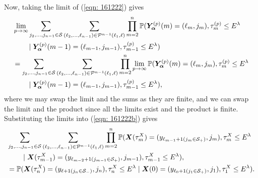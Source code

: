Now, taking the limit of (\ref{eqn: 161222}) gives 
\begin{align}
	&\lim_{p\to\infty}\sum_{j_2,\dots,j_{n-1}\in\mathcal S}\sum_{(\ell_2,\dots,\ell_{n-1}) \in\mathcal P^{n-1}(\ell_1,\ell)}\prod_{m=2}^{n}\mathbb P(\bm{Y}_{\bm{\alpha}}^{(p)}(m) = (\ell_m, j_m), \tau_{m}^{(p)}\leq E^\lambda \nonumber
            	 \\&\qquad\mid \bm{Y}_{\bm{\alpha}}^{(p)}(m-1) = (\ell_{m-1}, j_{m-1}), \tau_{m-1}^{(p)}\leq E^\lambda) \nonumber 
	\\ &=\sum_{j_2,\dots,j_{n-1}\in\mathcal S}\sum_{(\ell_2,\dots,\ell_{n-1}) \in\mathcal P^{n-1}(\ell_1,\ell)}\prod_{m=2}^{n}\lim_{p\to\infty} \mathbb P(\bm{Y}_{\bm{\alpha}}^{(p)}(m) = (\ell_m, j_m), \tau_{m}^{(p)}\leq E^\lambda \nonumber
            	 \\&\qquad \mid \bm{Y}_{\bm{\alpha}}^{(p)}(m-1) = (\ell_{m-1}, 
	 	 j_{m-1}), \tau_{m-1}^{(p)}\leq E^\lambda),
	 \label{eqn: 161222b}
\end{align}
where we may swap the limit and the sums as they are finite, and we can swap the limit and the product since all the limits exist and the product is finite. Substituting the limits into (\ref{eqn: 161222b}) gives 
\begin{align}
	&\sum_{j_2,\dots,j_{n-1}\in\mathcal S}\sum_{(\ell_2,\dots,\ell_{n-1})  \in\mathcal P^{n-1}(\ell_1,\ell)} \prod_{m=2}^{n}\mathbb P(\boldsymbol X(\tau_m^X) = (y_{\ell_{m-1}+1(j_{m}\in\mathcal S_+)}, j_m), \tau_{m}^X\leq E^\lambda \nonumber
            	\\&\qquad \mid \boldsymbol X(\tau_{m-1}^X)=(y_{\ell_{m-2}+1(j_{m-1}\in\mathcal S_+)},j_{m-1}),\tau_{m-1}^X\leq E^\lambda),\nonumber
		\\&= \mathbb P(\boldsymbol X(\tau_n^X) = (y_{\ell+1(j_{n}\in\mathcal S_-)}, 
		j_n), \tau_{n}^X\leq E^\lambda \mid \boldsymbol X(0)=(y_{\ell_{0}+1(j_{1}\in\mathcal S_+)},
		j_{1}), 
		\tau_1^X\leq E^\lambda).
\end{align}

